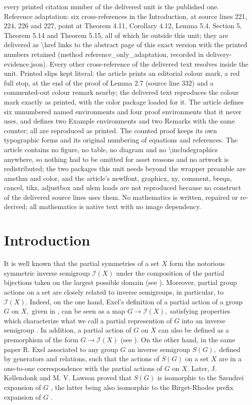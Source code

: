 \documentclass[10pt,a4paper]{amsart}
\theoremstyle{definition}
\theoremstyle{remark}
\numberwithin{equation}{section}
\newtheorem*{Theorem A}{\textbf{Theorem A}}
\newtheorem*{Corollary E}{\textbf{Corollary E}}
\newtheorem*{Corollary F}{\textbf{Corollary F}}
\newtheorem*{Theorem B}{\textbf{Theorem B}}
\newtheorem*{Theorem C}{\textbf{Theorem C}}
\newtheorem*{Theorem D}{\textbf{Theorem B}}
\newtheorem*{p a}{\textbf{Proof of  Theorem A}}
\newtheorem*{p b}{\textbf{Proof of Theorem B}}
\newtheorem*{p c}{\textbf{Proof of  Theorem C}}
\newtheorem*{p d}{\textbf{Proof of  Theorem D}}
\newcommand{\0}{{\vartheta}}
\begin{document}
every printed citation number of the delivered unit is the published one. Reference adaptation: six cross-references in the Introduction, at source lines 221, 224, 226 and 227, point at Theorem 4.11, Corollary 4.12, Lemma 5.4, Section 5, Theorem 5.14 and Theorem 5.15, all of which lie outside this unit; they are delivered as \textbackslash{}href links to the abstract page of this exact version with the printed numbers retained (method reference\_only\_adaptation, recorded in delivery-evidence.json). Every other cross-reference of the delivered text resolves inside the unit. Printed slips kept literal: the article prints an editorial colour mark, a red full stop, at the end of the proof of Lemma 2.7 (source line 332) and a commented-out colour remark nearby; the delivered text reproduces the colour mark exactly as printed, with the color package loaded for it. The article defines six unnumbered named environments and four proof environments that it never uses, and defines two Example environments and two Remarks with the same counter; all are reproduced as printed. The counted proof keeps its own typographic forms and its original numbering of equations and references. The article contains no figure, no table, no diagram and no \textbackslash{}includegraphics anywhere, so nothing had to be omitted for asset reasons and no artwork is redistributed; the two packages this unit needs beyond the wrapper preamble are amsthm and color, and the article's newlfont, graphicx, xy, comment, breqn, cancel, tikz, adjustbox and ulem loads are not reproduced because no construct of the delivered source lines uses them. No mathematics is written, repaired or re-derived; all mathematics is native text with no image dependency.
\section{Introduction}

 It is well known that  the  partial symmetries of a  set $X$ form the notorious  symmetric inverse semigroup ${\mathcal I}(X)$  under the composition of the partial bijections taken on the largest possible domain (see \cite{Lawson}). Moreover,  partial group actions on  a set are closely related to inverse semigroups, in particular, to ${\mathcal I}(X).$   Indeed, on the one hand,  Exel's definition of a partial action of a group $G$ on $X,$ given in  \cite[Definition 1.2]{Exel1998}, can be seen as a
  map $G\to {\mathcal I}(X),$ satisfying properties which characterize what we call a partial represention of $G$ into an inverse semigroup \cite[Proposition 4.1]{Exel1998}. In addition, a partial action of $G$ on $X$ can also be defined as a  premorphism of the form $G \to {\mathcal I}(X)$ (see  \cite[Proposition 2.1]{KL}).
  On the other hand, in the same paper \cite{Exel1998}  R. Exel associated to any group $G$ an inverse semigroup $S(G),$  defined by generators and relations, such that the actions of $S(G)$ on a set $X$ are  in a one-to-one correspondence  with the partial actions of $G$ on $X.$ Later,  J. Kellendonk and   M. V. Lawson \cite{KL} proved that $S(G)$  is isomorphic to the Szendrei expansion of $G$ \cite{Szendrei},  the latter being also isomorphic to the Birget-Rhodes prefix expansion of $G$  \cite{BR2}.
\end{document}
